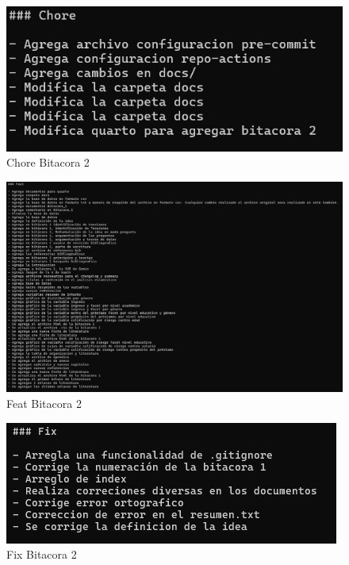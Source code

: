 \documentclass[
  letterpaper,
  DIV=11,
  numbers=noendperiod]{scrreprt}
\begin{document}
\begin{figure}[H]

{\centering \includegraphics{imagenes/chore_2.jpeg}

}

\caption{Chore Bitacora 2}

\end{figure}%
\begin{figure}[H]

{\centering \includegraphics{imagenes/feat_2.jpeg}

}

\caption{Feat Bitacora 2}

\end{figure}%
\begin{figure}[H]

{\centering \includegraphics{imagenes/fix_2.jpeg}

}

\caption{Fix Bitacora 2}

\end{figure}%
\end{document}
